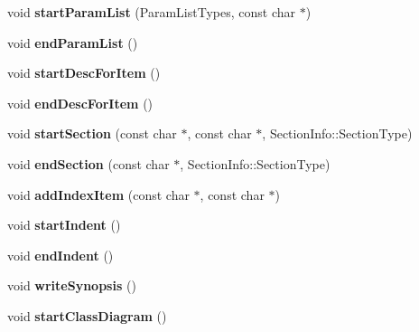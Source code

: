 \begin{DoxyCompactItemize}
void {\bfseries start\+Param\+List} (Param\+List\+Types, const char $\ast$)
\item 
\mbox{\label{class_r_t_f_generator_ac34fa07c0453017057bf8d6b9863c8d4}} 
void {\bfseries end\+Param\+List} ()
\item 
\mbox{\label{class_r_t_f_generator_af015080aa4a53dc119385ed520258a93}} 
void {\bfseries start\+Desc\+For\+Item} ()
\item 
\mbox{\label{class_r_t_f_generator_ad60deab094f7a994b685e0b55639839c}} 
void {\bfseries end\+Desc\+For\+Item} ()
\item 
\mbox{\label{class_r_t_f_generator_aa28599035df308890bfb4abfcd322c6d}} 
void {\bfseries start\+Section} (const char $\ast$, const char $\ast$, Section\+Info\+::\+Section\+Type)
\item 
\mbox{\label{class_r_t_f_generator_af33a34d8ccdbda134053ca89eeeacf5a}} 
void {\bfseries end\+Section} (const char $\ast$, Section\+Info\+::\+Section\+Type)
\item 
\mbox{\label{class_r_t_f_generator_af35b41bf3bcf9a94af08ba6d68d2df23}} 
void {\bfseries add\+Index\+Item} (const char $\ast$, const char $\ast$)
\item 
\mbox{\label{class_r_t_f_generator_a4dd78ad24988675c5a4b38ff3a5a120a}} 
void {\bfseries start\+Indent} ()
\item 
\mbox{\label{class_r_t_f_generator_a9693d67a2739f84501b2110cba6e5662}} 
void {\bfseries end\+Indent} ()
\item 
\mbox{\label{class_r_t_f_generator_ab563733ac3c9c90d116f7d3d24719bcc}} 
void {\bfseries write\+Synopsis} ()
\item 
\mbox{\label{class_r_t_f_generator_ac5ecece390049b98cf025a674bf70f75}} 
void {\bfseries start\+Class\+Diagram} ()
\item 
\mbox{\label{class_r_t_f_generator_a1115a488adc5c7ea481cbf6c3cd9eb0a}} 

\end{DoxyCompactItemize}
